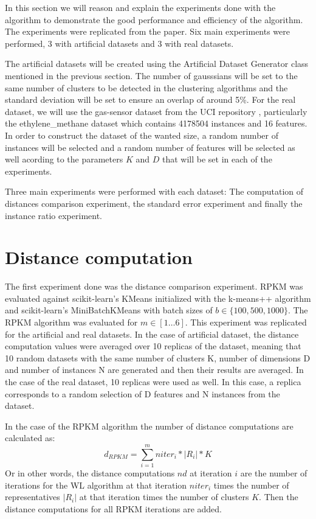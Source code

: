 In this section we will reason and explain the experiments done with the algorithm to demonstrate the good performance and efficiency of the algorithm. The experiments were replicated from the paper. Six main experiments were performed, 3 with artificial datasets and 3 with real datasets.

The artificial datasets will be created using the Artificial Dataset Generator class mentioned in the previous section. The number of gausssians will be set to the same number of clusters to be detected in the clustering algorithms and the standard deviation will be set to ensure an overlap of around 5\%. For the real dataset, we will use the gas-sensor dataset \cite{UCIGas} from the UCI repository \cite{UCI}, particularly the ethylene\_methane dataset which contains 4178504 instances and 16 features. In order to construct the dataset of the wanted size, a random number of instances will be selected and a random number of features will be selected as well acording to the parameters $K$ and $D$ that will be set in each of the experiments.

Three main experiments were performed with each dataset: The computation of distances comparison experiment, the standard error experiment and finally the instance ratio experiment.

\section{Distance computation}

The first experiment done was the distance comparison experiment. RPKM was evaluated against scikit-learn's KMeans initialized with the k-means++ algorithm and scikit-learn's MiniBatchKMeans with batch sizes of $b \in \{100, 500, 1000\}$. The RPKM algorithm was evaluated for $m \in [1\dots6]$. This experiment was replicated for the artificial and real datasets. In the case of artificial dataset, the distance computation values were averaged over 10 replicas of the dataset, meaning that 10 random datasets with the same number of clusters K, number of dimensions D and number of instances N are generated and then their results are averaged. In the case of the real dataset, 10 replicas were used as well. In this case, a replica corresponds to a random selection of D features and N instances from the dataset.

In the case of the RPKM algorithm the number of distance computations are calculated as:
$$d_{RPKM} = \sum_{i=1}^m niter_i * |R_i| *K$$
Or in other words, the distance computations $nd$ at iteration $i$ are the number of iterations for the WL algorithm at that iteration $niter_i$ times the number of representatives $|R_i|$ at that iteration times the number of clusters $K$. Then the distance computations for all RPKM iterations are added.


